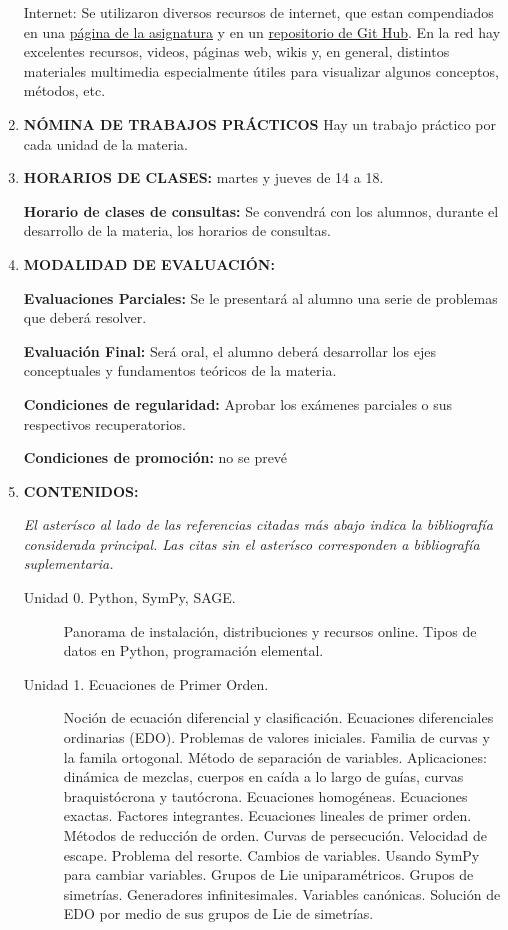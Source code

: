 \documentclass[12pt]{article}
\begin{document}
\begin{enumerate}
		  Internet:  Se utilizaron diversos recursos de internet, que estan compendiados en una \href{http://fdmazzone.github.io/Ecuaciones_Diferenciales/}{página de la asignatura} y en un \href{https://github.com/fdmazzone/Ecuaciones_Diferenciales}{repositorio de Git Hub}.  En la red  hay excelentes recursos, videos, páginas web, wikis  y, en general, distintos materiales multimedia especialmente útiles para visualizar algunos conceptos, métodos, etc.

 \item\textbf{  NÓMINA DE TRABAJOS PRÁCTICOS}
		Hay un trabajo práctico por cada unidad de la materia.

\item\textbf{   HORARIOS DE CLASES:} martes y jueves de 14 a 18.


 \textbf{  Horario de clases de consultas:}
	Se convendrá con los alumnos, durante el desarrollo de la materia,
  los horarios de consultas.


\item\textbf{   MODALIDAD DE EVALUACIÓN:}

\textbf{Evaluaciones Parciales:}  Se le presentará al alumno una serie de problemas que deberá resolver.

\textbf{Evaluación Final:} Será oral, el alumno deberá desarrollar los ejes conceptuales y fundamentos teóricos de la materia.

\textbf{  Condiciones de regularidad:}
Aprobar los exámenes parciales o sus respectivos recuperatorios.

\textbf{  Condiciones de promoción:} no se prevé

\item\textbf{ CONTENIDOS:}

\emph{
El asterísco al lado de las referencias citadas más abajo indica la bibliografía considerada principal. Las citas sin el asterísco corresponden a bibliografía suplementaria.}

\begin{description}
 \item[Unidad 0. Python, SymPy, SAGE.] Panorama de instalación, distribuciones y recursos online. Tipos de datos en Python, programación elemental.

\item[Unidad 1. Ecuaciones de Primer Orden.]  Noción de ecuación diferencial y clasificación. Ecuaciones diferenciales ordinarias (EDO).   Problemas de valores iniciales. Familia de curvas y la famila ortogonal. Método de separación de variables. Aplicaciones: dinámica de mezclas, cuerpos en caída a lo largo de guías, curvas braquistócrona y tautócrona. Ecuaciones homogéneas. Ecuaciones exactas. Factores integrantes. Ecuaciones lineales de primer orden. Métodos de reducción de orden. Curvas de persecución. Velocidad de escape. Problema del resorte. Cambios de variables. Usando SymPy para cambiar variables.  Grupos de Lie uniparamétricos. Grupos de simetrías. Generadores infinitesimales. Variables canónicas. Solución de EDO por medio de sus grupos de Lie de simetrías. \cite{simmons_esp, WilliamE.Boyce496,PeterE.Hydon455,S.V.DuzhinB.D.Chebotarevsky465}


\end{description}
\end{enumerate}
\end{document}

